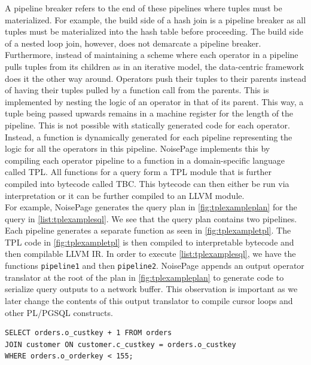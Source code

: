 \documentclass[12pt]{cmuthesis}
\newcommand{\sysname}{NoisePage\xspace}
\newcommand{\dbTable}[1]{\texttt{\MakeUppercase{#1}}\xspace}
\begin{document}
A pipeline breaker refers to the end of these pipelines where tuples must be materialized. For example, the build side of a hash join is a pipeline breaker as all tuples must be materialized into the hash table before proceeding. The build side of a nested loop join, however, does not demarcate a pipeline breaker. Furthermore, instead of maintaining a scheme where each operator in a pipeline pulls tuples from its children as in an iterative model, the data-centric framework does it the other way around. Operators push their tuples to their parents instead of having their tuples pulled by a function call from the parents. This is implemented by nesting the logic of an operator in that of its parent. This way, a tuple being passed upwards remains in a machine register for the length of the pipeline. This is not possible with statically generated code for each operator. Instead, a function is dynamically generated for each pipeline representing the logic for all the operators in this pipeline. \sysname implements this by compiling each operator pipeline to a function in a domain-specific language called TPL. All functions for a query form a TPL module that is further compiled into bytecode called TBC. This bytecode can then either be run via interpretation or it can be further compiled to an LLVM module.\\

For example, \sysname generates the query plan in \cref{fig:tplexampleplan} for the query in \cref{list:tplexamplesql}. We see that the query plan contains two pipelines. Each pipeline generates a separate function as seen in \cref{fig:tplexampletpl}. The TPL code in \cref{fig:tplexampletpl} is then compiled to interpretable bytecode and then compilable LLVM IR. In order to execute \cref{list:tplexamplesql}, we have the functions \texttt{pipeline1} and then \texttt{pipeline2}. \sysname appends an output operator translator at the root of the plan in \cref{fig:tplexampleplan} to generate code to serialize query outputs to a network buffer. This observation is important as we later change the contents of this output translator to compile cursor loops and other PL/PGSQL constructs.


\begin{listing}
    \begin{verbatim}
SELECT orders.o_custkey + 1 FROM orders 
JOIN customer ON customer.c_custkey = orders.o_custkey 
WHERE orders.o_orderkey < 155;
    \end{verbatim}
    \caption{Join query on \dbTable{orders} and \dbTable{customer} with a filter and projection}
    \label{list:tplexamplesql}
    \end{listing}
\end{document}
